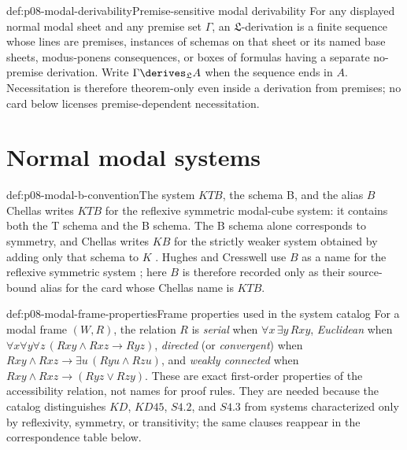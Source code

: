\begin{hbconvention}{def:p08-modal-derivability}{Premise-sensitive modal derivability}
For any displayed normal modal sheet and any premise set \(\Gamma\), an
\(\mathfrak L\)-derivation is a finite sequence whose lines are premises,
instances of schemas on that sheet or its named base sheets, modus-ponens
consequences, or boxes of formulas having a separate no-premise derivation.
Write \(\Gamma\derives_{\mathfrak L}A\) when the sequence ends in \(A\).
Necessitation is therefore theorem-only even inside a derivation from premises;
no card below licenses premise-dependent necessitation.
\end{hbconvention}

\section{Normal modal systems}

\begin{hbwarning}{def:p08-modal-b-convention}{The system \(KTB\), the schema B, and the alias \(B\)}
Chellas writes \(KTB\) for the reflexive symmetric modal-cube system: it
contains both the T schema and the B schema.  The B schema alone corresponds
to symmetry, and Chellas writes \(KB\) for the strictly weaker system obtained
by adding only that schema to \(K\) \cite{Chellas1980}.  Hughes and Cresswell
use \(B\) as a name for the reflexive symmetric system
\cite{HughesCresswell1996}; here \(B\) is therefore recorded only as their
source-bound alias for the card whose Chellas name is \(KTB\).
\end{hbwarning}

\begin{hbdefinition}{def:p08-modal-frame-properties}{Frame properties used in the system catalog}
For a modal frame \((W,R)\), the relation \(R\) is \emph{serial} when
\(\forall x\,\exists y\,Rxy\), \emph{Euclidean} when
\(\forall x\forall y\forall z\,(Rxy\land Rxz\to Ryz)\),
\emph{directed} (or \emph{convergent}) when
\(Rxy\land Rxz\to\exists u\,(Ryu\land Rzu)\), and \emph{weakly connected}
when \(Rxy\land Rxz\to(Ryz\lor Rzy)\).  These are exact first-order
properties of the accessibility relation, not names for proof rules.  They are
needed because the catalog distinguishes \(KD\), \(KD45\), \(S4.2\), and
\(S4.3\) from systems
characterized only by reflexivity, symmetry, or transitivity; the same clauses
reappear in the correspondence table below.
\end{hbdefinition}


